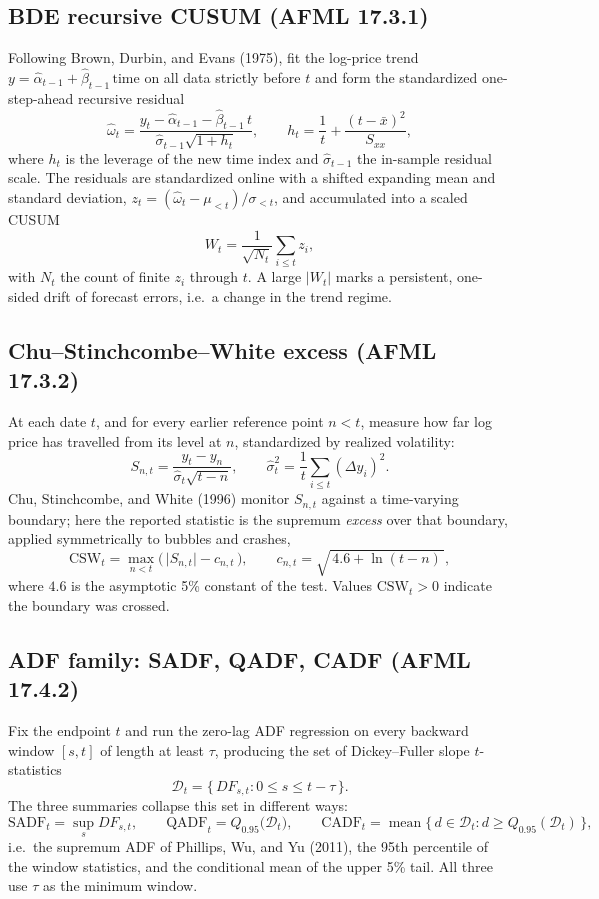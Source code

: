 \documentclass[11pt]{article}
\begin{document}
\subsection{BDE recursive CUSUM (AFML 17.3.1)}

Following Brown, Durbin, and Evans (1975), fit the log-price trend $y=\hat\alpha_{t-1}+\hat\beta_{t-1}\,\mathrm{time}$ on all data strictly before $t$ and form the standardized one-step-ahead recursive residual
\[
    \hat\omega_t = \frac{y_t - \hat\alpha_{t-1} - \hat\beta_{t-1}\, t}{\hat\sigma_{t-1}\sqrt{1 + h_t}},
    \qquad
    h_t = \frac{1}{t} + \frac{(t-\bar x)^2}{S_{xx}},
\]
where $h_t$ is the leverage of the new time index and $\hat\sigma_{t-1}$ the in-sample residual scale. The residuals are standardized online with a shifted expanding mean and standard deviation, $z_t=(\hat\omega_t-\mu_{<t})/\sigma_{<t}$, and accumulated into a scaled CUSUM
\[
    W_t = \frac{1}{\sqrt{N_t}}\sum_{i\le t} z_i ,
\]
with $N_t$ the count of finite $z_i$ through $t$. A large $|W_t|$ marks a persistent, one-sided drift of forecast errors, i.e.\ a change in the trend regime.

\subsection{Chu--Stinchcombe--White excess (AFML 17.3.2)}

At each date $t$, and for every earlier reference point $n<t$, measure how far log price has travelled from its level at $n$, standardized by realized volatility:
\[
    S_{n,t} = \frac{y_t-y_n}{\hat\sigma_t\sqrt{t-n}},
    \qquad
    \hat\sigma_t^2 = \frac{1}{t}\sum_{i\le t} (\Delta y_i)^2 .
\]
Chu, Stinchcombe, and White (1996) monitor $S_{n,t}$ against a time-varying boundary; here the reported statistic is the supremum \emph{excess} over that boundary, applied symmetrically to bubbles and crashes,
\[
    \mathrm{CSW}_t = \max_{n<t}\Big(\,\lvert S_{n,t}\rvert - c_{n,t}\,\Big),
    \qquad
    c_{n,t} = \sqrt{\,4.6 + \ln(t-n)\,},
\]
where $4.6$ is the asymptotic 5\% constant of the test. Values $\mathrm{CSW}_t>0$ indicate the boundary was crossed.

\subsection{ADF family: SADF, QADF, CADF (AFML 17.4.2)}

Fix the endpoint $t$ and run the zero-lag ADF regression on every backward window $[s,t]$ of length at least $\tau$, producing the set of Dickey--Fuller slope $t$-statistics
\[
    \mathcal{D}_t = \big\{\, DF_{s,t} : 0 \le s \le t-\tau \,\big\}.
\]
The three summaries collapse this set in different ways:
\[
    \mathrm{SADF}_t = \sup_{s} DF_{s,t},
    \qquad
    \mathrm{QADF}_t = Q_{0.95}\!\big(\mathcal{D}_t\big),
    \qquad
    \mathrm{CADF}_t = \operatorname{mean}\big\{\, d \in \mathcal{D}_t : d \ge Q_{0.95}(\mathcal{D}_t) \,\big\},
\]
i.e.\ the supremum ADF of Phillips, Wu, and Yu (2011), the 95th percentile of the window statistics, and the conditional mean of the upper 5\% tail. All three use $\tau$ as the minimum window.
\end{document}
